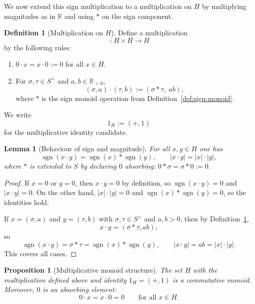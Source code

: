 \documentclass[11pt]{amsart}
\numberwithin{equation}{section}
\newtheorem{proposition}[theorem]{Proposition}
\newtheorem{lemma}[theorem]{Lemma}
\theoremstyle{definition}
\newtheorem{definition}[theorem]{Definition}
\theoremstyle{remark}
\newcommand{\R}{\mathbb{R}}
\newcommand{\Rp}{\mathbb{R}_{>0}}
\newcommand{\Hnum}{H}                      %
\newcommand{\Sset}{S}                      %
\newcommand{\Snon}{S^{\times}}             %
\newcommand{\sgn}{\operatorname{sgn}}
\newcommand{\idH}{1_H}
\begin{document}
We now extend this sign multiplication to a multiplication on $\Hnum$
by multiplying magnitudes as in $\R$ and using $*$ on the sign
component.

\begin{definition}[Multiplication on $\Hnum$]\label{def:H-multiplication}
Define a multiplication
\[
  \cdot : \Hnum\times\Hnum \longrightarrow \Hnum
\]
by the following rules:
\begin{enumerate}
  \item $0\cdot x = x\cdot 0 := 0$ for all $x\in\Hnum$.
  \item For $\sigma,\tau\in\Snon$ and $a,b\in\Rp$,
  \[
    (\sigma,a)\cdot(\tau,b)
    := (\sigma*\tau,\; ab),
  \]
  where $*$ is the sign monoid operation from
  Definition~\ref{def:sign-monoid}.
\end{enumerate}
We write
\[
  \idH := (+,1)
\]
for the multiplicative identity candidate.
\end{definition}

\begin{lemma}[Behaviour of sign and magnitude]\label{lem:sgn-magnitude-mult}
For all $x,y\in\Hnum$ one has
\[
  \sgn(x\cdot y) = \sgn(x)*\sgn(y),\qquad
  |x\cdot y| = |x|\cdot|y|,
\]
where $*$ is extended to $\Sset$ by declaring $0$ absorbing:
$0*\sigma=\sigma*0:=0$.
\end{lemma}

\begin{proof}
If $x=0$ or $y=0$, then $x\cdot y=0$ by definition, so
$\sgn(x\cdot y)=0$ and $|x\cdot y|=0$.  On the other hand,
$|x|\cdot|y|=0$ and $\sgn(x)*\sgn(y)=0$, so the identities hold.

If $x=(\sigma,a)$ and $y=(\tau,b)$ with $\sigma,\tau\in\Snon$ and
$a,b>0$, then by Definition~\ref{def:H-multiplication},
\[
  x\cdot y = (\sigma*\tau,ab),
\]
so
\[
  \sgn(x\cdot y) = \sigma*\tau = \sgn(x)*\sgn(y),
  \qquad
  |x\cdot y| = ab = |x|\cdot|y|.
\]
This covers all cases.
\end{proof}

\begin{proposition}[Multiplicative monoid structure]\label{prop:H-monoid}
The set $\Hnum$ with the multiplication defined above and identity
$\idH=(+,1)$ is a commutative monoid.  Moreover, $0$ is an absorbing
element:
\[
  0\cdot x = x\cdot 0 = 0
  \qquad\text{for all }x\in\Hnum.
\]
\end{proposition}
\end{document}
